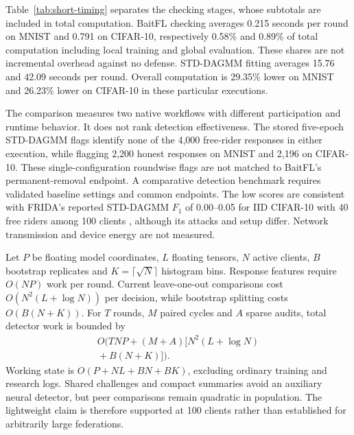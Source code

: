 \documentclass[conference]{IEEEtran}
\makeatletter
\renewcommand{\section}{\@startsection{section}{1}{\z@}{1.5ex}{0.7ex}{\normalfont\normalsize\centering\scshape}}
\makeatother
\begin{document}
Table~\ref{tab:short-timing} separates the checking stages, whose
subtotals are included in total computation. BaitFL checking averages
0.215 seconds per round on MNIST and 0.791 on CIFAR-10, respectively
0.58\% and 0.89\% of total computation including local training and
global evaluation. These shares are not incremental overhead against
no defense. STD-DAGMM fitting averages 15.76 and 42.09 seconds per round.
Overall computation is 29.35\% lower on MNIST and
26.23\% lower on CIFAR-10 in these particular executions.

The comparison measures two native workflows with different participation
and runtime behavior. It does not rank detection effectiveness. The stored
five-epoch STD-DAGMM flags identify none of the 4,000 free-rider responses
in either execution, while flagging 2,200 honest responses on MNIST and
2,196 on CIFAR-10. These single-configuration roundwise flags are not
matched to BaitFL's permanent-removal endpoint. A comparative detection
benchmark requires validated baseline settings and common endpoints.
The low scores are consistent with FRIDA's reported STD-DAGMM $F_1$
of 0.00--0.05 for IID CIFAR-10 with 40 free riders among 100 clients
\cite{recasens2026frida}, although its attacks and setup differ.
Network transmission and device energy are not measured.

\section{Complexity and Limitations}
Let $P$ be floating model coordinates, $L$ floating tensors, $N$ active
clients, $B$ bootstrap replicates and $K=\lceil\sqrt N\rceil$ histogram
bins. Response features require $O(NP)$ work per round. Current
leave-one-out comparisons cost $O(N^2(L+\log N))$ per decision, while
bootstrap splitting costs $O(B(N+K))$. For $T$ rounds, $M$ paired cycles
and $A$ sparse audits, total detector work is bounded by
\begin{equation}
\begin{split}
O\bigl(TNP+(M+A)\bigl[N^2(L+\log N)\\
{}+B(N+K)\bigr]\bigr).
\end{split}
\end{equation}
Working state is $O(P+NL+BN+BK)$, excluding ordinary training and
research logs. Shared challenges and compact summaries avoid an auxiliary
neural detector, but peer comparisons remain quadratic in population.
The lightweight claim is therefore supported at 100 clients rather than
established for arbitrarily large federations.
\end{document}
